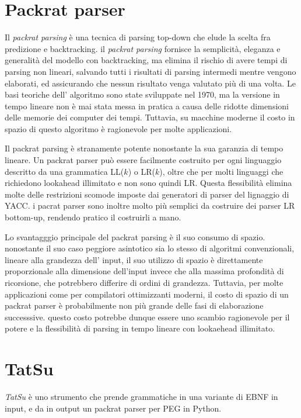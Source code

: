 \section{Packrat parser}
Il \textit{packrat parsing}\cite{brianford2} è una tecnica di parsing top-down che elude la scelta fra predizione e backtracking. il \textit{packrat parsing} fornisce la semplicità, eleganza e generalità del modello con backtracking, ma elimina il rischio di avere tempi di parsing non lineari, salvando tutti i risultati di parsing intermedi mentre vengono elaborati, ed assicurando che nessun risultato venga valutato più di una volta. Le basi teoriche dell' algoritmo sono state sviluppate nel 1970\cite{1970, 1971}, ma la versione in tempo lineare non è mai stata messa in pratica a causa delle ridotte dimensioni delle memorie dei computer dei tempi. Tuttavia, su macchine moderne il costo in spazio di questo algoritmo è ragionevole per molte applicazioni. 

Il packrat parsing è stranamente potente nonostante la sua garanzia di tempo lineare. Un packrat parser può essere facilmente costruito per ogni linguaggio descritto da una grammatica LL($k$) o LR($k$), oltre che per molti linguaggi che richiedono lookahead illimitato e non sono quindi LR. Questa flessibilità elimina molte delle restrizioni scomode imposte dai generatori di parser del lignaggio di YACC. i pacrat parser sono inoltre molto più semplici da costruire dei parser LR bottom-up, rendendo pratico il costruirli a mano.

Lo svantagggio principale del packrat parsing è il suo consumo di spazio. nonostante il suo caso peggiore asintotico sia lo stesso di algoritmi convenzionali, lineare alla grandezza dell' input, il suo utilizzo di spazio è direttamente proporzionale alla dimensione dell'input invece che alla massima profondità di ricorsione, che potrebbero differire di ordini di grandezza. Tuttavia, per molte applicazioni come per compilatori ottimizzanti moderni, il costo di spazio di un packrat parser è probabilmente non più grande delle fasi di elaborazione successsive. questo costo potrebbe dunque essere uno scambio ragionevole per il potere e la flessibilità di parsing in tempo lineare con lookaehead illimitato.

\section{TatSu}
\textit{TatSu} è uno strumento che prende grammatiche in una variante di EBNF in input, e da in output un packrat parser per PEG in Python.

